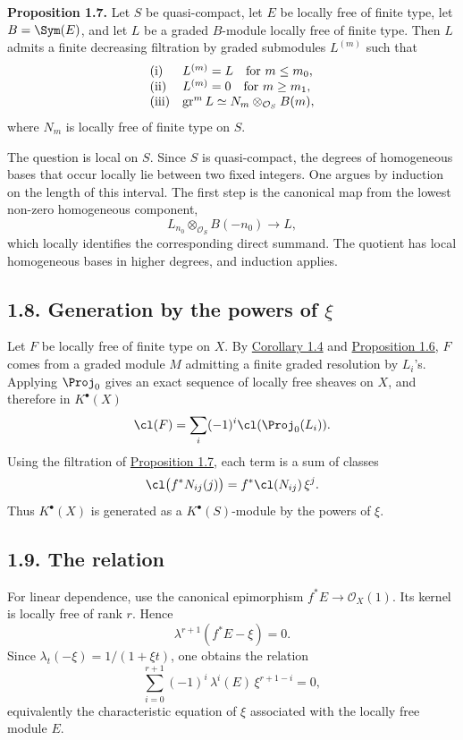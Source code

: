 \textbf{Proposition 1.7.} Let \(S\) be quasi-compact, let \(E\) be locally free of finite type, let \(B=\Sym(E)\), and let \(L\) be a graded \(B\)-module locally free of finite type. Then \(L\) admits a finite decreasing filtration by graded submodules \(L^{(m)}\) such that
\[
\begin{array}{ll}
\text{\rm (i)}& L^{(m)}=L\quad\text{for }m\leq m_0,\\
\text{\rm (ii)}& L^{(m)}=0\quad\text{for }m\geq m_1,\\
\text{\rm (iii)}& \operatorname{gr}^m L
  \simeq N_m\otimes_{\mathcal O_S}B(m),
\end{array}
\]
where \(N_m\) is locally free of finite type on \(S\).

The question is local on \(S\). Since \(S\) is quasi-compact, the degrees of homogeneous bases that occur locally lie between two fixed integers. One argues by induction on the length of this interval. The first step is the canonical map from the lowest non-zero homogeneous component,
\[
  L_{n_0}\otimes_{\mathcal O_S}B(-n_0)\longrightarrow L,
\]
which locally identifies the corresponding direct summand. The quotient has local homogeneous bases in higher degrees, and induction applies.

\subsection*{1.8. Generation by the powers of \(\xi\)}
Let \(F\) be locally free of finite type on \(X\). By \hyperlink{sga6.e06.cor.1-4}{Corollary 1.4} and \hyperlink{sga6.e06.prop.1-6}{Proposition 1.6}, \(F\) comes from a graded module \(M\) admitting a finite graded resolution by \(L_i\)'s. Applying \(\Proj_0\) gives an exact sequence of locally free sheaves on \(X\), and therefore in \(K^\bullet(X)\)
\[
  \cl(F)=\sum_i(-1)^i\cl(\Proj_0(L_i)).
\]
Using the filtration of \hyperlink{sga6.e06.prop.1-7}{Proposition 1.7}, each term is a sum of classes
\[
  \cl\bigl(f^*N_{ij}(j)\bigr)=f^*\cl(N_{ij})\,\xi^j .
\]
Thus \(K^\bullet(X)\) is generated as a \(K^\bullet(S)\)-module by the powers of \(\xi\).

\subsection*{1.9. The relation}
For linear dependence, use the canonical epimorphism \(f^*E\to\mathcal O_X(1)\). Its kernel is locally free of rank \(r\). Hence
\[
  \lambda^{r+1}(f^*E-\xi)=0.
\]
Since \(\lambda_t(-\xi)=1/(1+\xi t)\), one obtains the relation
\begin{equation}\tag{1.9.1}
  \sum_{i=0}^{r+1}(-1)^i\,\lambda^i(E)\,\xi^{r+1-i}=0,
\end{equation}
equivalently the characteristic equation of \(\xi\) associated with the locally free module \(E\).

